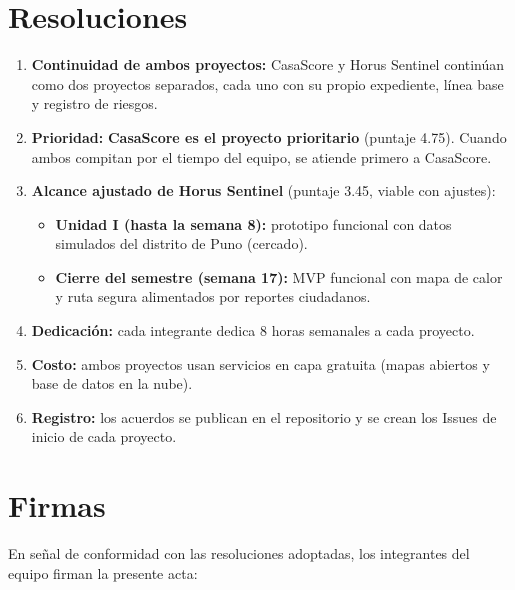 \documentclass[11pt,a4paper]{article}
\begin{document}
\section{Resoluciones}
\begin{enumerate}[leftmargin=*]
    \item \textbf{Continuidad de ambos proyectos:} CasaScore y Horus Sentinel continúan como dos proyectos separados, cada uno con su propio expediente, línea base y registro de riesgos.
    \item \textbf{Prioridad:} \textbf{CasaScore es el proyecto prioritario} (puntaje 4.75). Cuando ambos compitan por el tiempo del equipo, se atiende primero a CasaScore.
    \item \textbf{Alcance ajustado de Horus Sentinel} (puntaje 3.45, viable con ajustes):
    \begin{itemize}
        \item \textbf{Unidad I (hasta la semana 8):} prototipo funcional con datos simulados del distrito de Puno (cercado).
        \item \textbf{Cierre del semestre (semana 17):} MVP funcional con mapa de calor y ruta segura alimentados por reportes ciudadanos.
    \end{itemize}
    \item \textbf{Dedicación:} cada integrante dedica 8 horas semanales a cada proyecto.
    \item \textbf{Costo:} ambos proyectos usan servicios en capa gratuita (mapas abiertos y base de datos en la nube).
    \item \textbf{Registro:} los acuerdos se publican en el repositorio y se crean los Issues de inicio de cada proyecto.
\end{enumerate}

\section{Firmas}
\noindent En señal de conformidad con las resoluciones adoptadas, los integrantes del equipo firman la presente acta:

\vspace{1.5cm}
\end{document}
